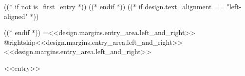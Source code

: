 ((* if not is_first_entry *))
\vspace{<<design.margins.entry_area.vertical_between>>}
((* endif *))
\begingroup((* if design.text_alignment == "left-aligned" *))\raggedright((* endif *))
\leftskip=<<design.margins.entry_area.left_and_right>>
\advance\csname @rightskip\endcsname <<design.margins.entry_area.left_and_right>>
\advance\rightskip <<design.margins.entry_area.left_and_right>>

<<entry>>
\par\endgroup
